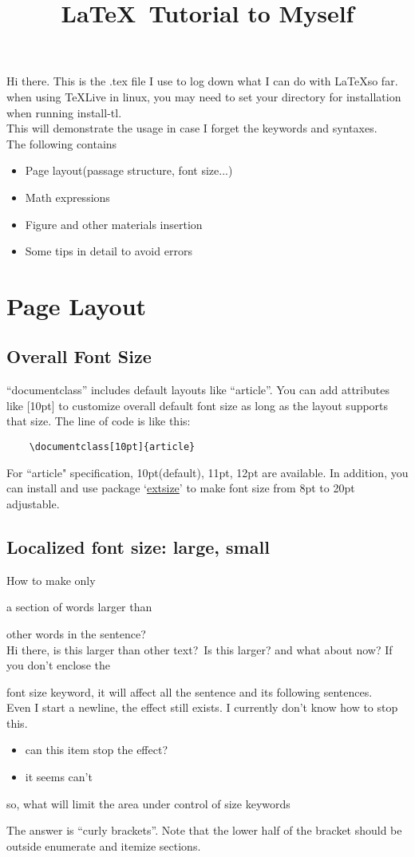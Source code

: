 \documentclass[12pt]{article}
\begin{document}
	\tableofcontents
\title{\LaTeX \ Tutorial to Myself}
\maketitle
\noindent
Hi there. This is the .tex file I use to log down what I can do with \LaTeX so far.
\\when using TeXLive in linux, you may need to set your directory for installation when running install-tl.
\\This will demonstrate the usage in case I forget the keywords and syntaxes.
\\The following contains 
\begin{itemize}
	\item Page layout(passage structure, font size...)
	\item Math expressions
	\item Figure and other materials insertion
	\item Some tips in detail to avoid errors
\end{itemize}
\section{Page Layout}
	\subsection{Overall Font Size}
	``documentclass'' includes default layouts like ``article''. You can add attributes like [10pt] to customize overall default font size as long as the layout supports that size. The line of code is like this:
	\begin{lstlisting}
	\documentclass[10pt]{article}
	\end{lstlisting}
	For ``article" specification, 10pt(default), 11pt, 12pt are available.
	In addition, you can install and use package `\href{http://ctan.mirror.rafal.ca/macros/latex/contrib/extsizes/extsizes.pdf}{extsize}' to make font size from 8pt to 20pt adjustable.
	\subsection{Localized font size: large, small}
	How to make only \begin{LARGE}a section of words larger than\end{LARGE} other words in the sentence?
	\\Hi there, is this larger than other text?{\LARGE\ Is this larger?} and what about now?
	If you don't enclose the {\LARGE{font size keyword}, it will affect all the sentence and its following sentences.
		\\Even I start a newline, the effect still exists. I currently don't know how to stop this.
		\begin{itemize}
			\item can this item stop the effect?
			\item it seems can't
		\end{itemize}
		so, what will limit the area under control of size keywords}
	The answer is ``curly brackets''. Note that the lower half of the bracket should be outside enumerate and itemize sections.
\end{document}
